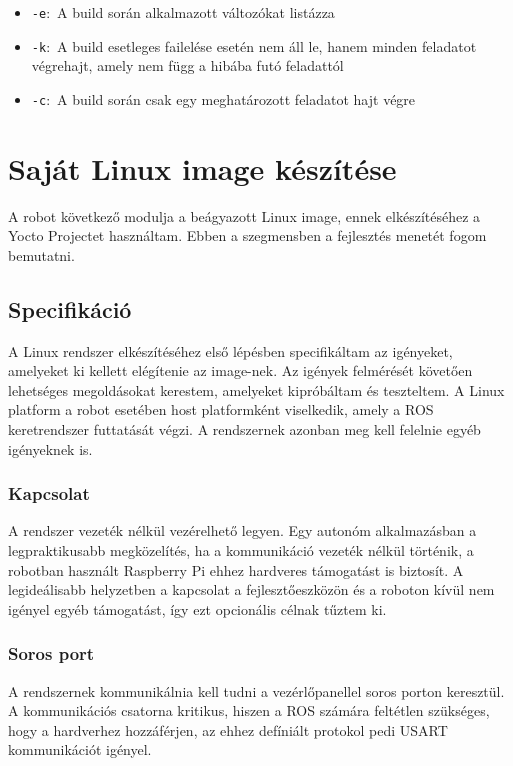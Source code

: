 \begin{itemize}
  \setlength\itemsep{0em}
\item{\verb|-e|:~A build során alkalmazott változókat listázza}
\item{\verb|-k|:~A build esetleges failelése esetén nem áll le, hanem minden
  feladatot végrehajt, amely nem függ a hibába futó feladattól}
\item{\verb|-c|:~A build során csak egy meghatározott feladatot hajt végre}
\end{itemize}

\section{Saját Linux image készítése}

A robot következő modulja a beágyazott Linux image, ennek elkészítéséhez a Yocto
Projectet használtam. Ebben a szegmensben a fejlesztés menetét fogom bemutatni.

\subsection{Specifikáció}

A Linux rendszer elkészítéséhez első lépésben specifikáltam az igényeket,
amelyeket ki kellett elégítenie az image-nek. Az igények felmérését követően
lehetséges megoldásokat kerestem, amelyeket kipróbáltam és teszteltem. A Linux
platform a robot esetében host platformként viselkedik, amely a ROS keretrendszer
futtatását végzi. A rendszernek azonban meg kell felelnie egyéb igényeknek is.

\subsubsection{Kapcsolat}

A rendszer vezeték nélkül vezérelhető legyen. Egy autonóm alkalmazásban a
legpraktikusabb megközelítés, ha a kommunikáció vezeték nélkül történik, a
robotban használt Raspberry Pi ehhez hardveres támogatást is biztosít. A
legideálisabb helyzetben a kapcsolat a fejlesztőeszközön és a roboton kívül nem
igényel egyéb támogatást, így ezt opcionális célnak tűztem ki.

\subsubsection{Soros port}

A rendszernek kommunikálnia kell tudni a vezérlőpanellel soros porton keresztül.
A kommunikációs csatorna kritikus, hiszen a ROS számára feltétlen szükséges, hogy
a hardverhez hozzáférjen, az ehhez defíniált protokol pedi USART kommunikációt
igényel.

